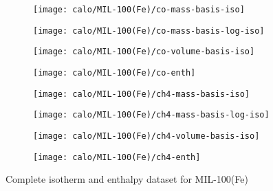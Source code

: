 \begin{figure}[H]
    \begin{subfigure}{0.25\textwidth}
        \texttt{[image: calo/MIL-100(Fe)/co-mass-basis-iso]}%
        \label{appx:fgr:shaping:mil100comass}
    \end{subfigure}%
    \begin{subfigure}{0.25\textwidth}
        \texttt{[image: calo/MIL-100(Fe)/co-mass-basis-log-iso]}%
        \label{appx:fgr:shaping:mil100comasslog}
    \end{subfigure}%
    \begin{subfigure}{0.25\textwidth}
        \texttt{[image: calo/MIL-100(Fe)/co-volume-basis-iso]}%
        \label{appx:fgr:shaping:mil100covolume}
    \end{subfigure}%
    \begin{subfigure}{0.25\textwidth}
        \texttt{[image: calo/MIL-100(Fe)/co-enth]}%
        \label{appx:fgr:shaping:mil100coenth}
    \end{subfigure}%


    \begin{subfigure}{0.25\textwidth}
        \texttt{[image: calo/MIL-100(Fe)/ch4-mass-basis-iso]}%
        \label{appx:fgr:shaping:mil100ch4mass}
    \end{subfigure}%
    \begin{subfigure}{0.25\textwidth}
        \texttt{[image: calo/MIL-100(Fe)/ch4-mass-basis-log-iso]}%
        \label{appx:fgr:shaping:mil100ch4masslog}
    \end{subfigure}%
    \begin{subfigure}{0.25\textwidth}
        \texttt{[image: calo/MIL-100(Fe)/ch4-volume-basis-iso]}%
        \label{appx:fgr:shaping:mil100ch4volume}
    \end{subfigure}%
    \begin{subfigure}{0.25\textwidth}
        \texttt{[image: calo/MIL-100(Fe)/ch4-enth]}%
        \label{appx:fgr:shaping:mil100ch4enth}
    \end{subfigure}%

    \caption{Complete isotherm and enthalpy dataset for MIL-100(Fe)}
    
\end{figure}

